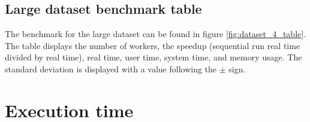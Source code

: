 \subsection{Large dataset benchmark table}
The benchmark for the large dataset can be found in figure \ref{fig:dataset_4_table}.
The table displays the number of workers, the speedup (sequential run real time divided by real time), real time,
user time, system time, and memory usage. The standard deviation is displayed with a value following the $\pm$ sign.

\begin{table}[ht]
\centering
{}
\caption[Large dataset benchmark table.]{Large dataset benchmark table. The table displays the number of workers, the speedup (sequential run real time divided by real time), real time,
user time, system time, and memory usage. The standard deviation is displayed with a value following the $\pm$ sign.}
\label{fig:dataset_4_table}
\end{table}


\FloatBarrier
\section{Execution time}

